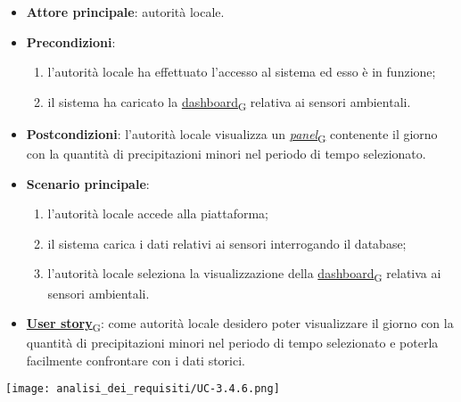 \newpage
{}
\begin{itemize}
	\item \textbf{Attore principale}: autorità locale.
	\item \textbf{Precondizioni}:
	      \begin{enumerate}
		      \item l'autorità locale ha effettuato l'accesso al sistema ed esso è in funzione;
		      \item il sistema ha caricato la \href{https://7last.github.io/docs/pb/documentazione-interna/glossario\#dashboard}{dashboard\textsubscript{G}} relativa ai sensori ambientali.
	      \end{enumerate}
	\item \textbf{Postcondizioni}: l'autorità locale visualizza un \href{https://7last.github.io/docs/pb/documentazione-interna/glossario\#panel}{\textit{panel}\textsubscript{G}} contenente il giorno con la quantità di precipitazioni minori nel periodo di tempo selezionato.
	\item \textbf{Scenario principale}:
	      \begin{enumerate}
		      \item l'autorità locale accede alla piattaforma;
		      \item il sistema carica i dati relativi ai sensori interrogando il database;
		      \item l'autorità locale seleziona la visualizzazione della \href{https://7last.github.io/docs/pb/documentazione-interna/glossario\#dashboard}{dashboard\textsubscript{G}} relativa ai sensori ambientali.
	      \end{enumerate}
	\item \href{https://7last.github.io/docs/pb/documentazione-interna/glossario\#user-story}{\textbf{User story}\textsubscript{G}}:
	      come autorità locale desidero poter visualizzare il giorno con la quantità di precipitazioni minori nel periodo di tempo selezionato
	      e poterla facilmente confrontare con i dati storici.
\end{itemize}
\begin{center}
	\texttt{[image: analisi\_dei\_requisiti/UC-3.4.6.png]}
\end{center}

